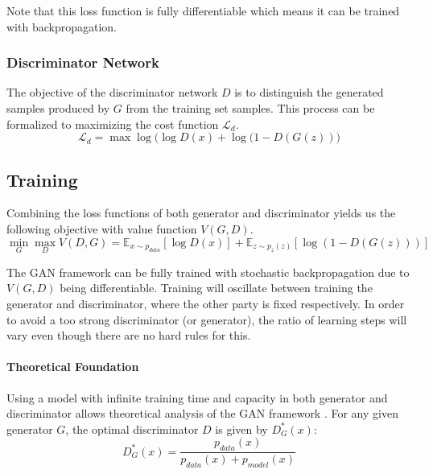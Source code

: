 Note that this loss function is fully differentiable which means it can be trained with backpropagation.



\subsubsection{Discriminator Network}
The objective of the discriminator network $D$ is to distinguish the generated samples produced by $G$ from the training set samples.
This process can be formalized to maximizing the cost function $\mathcal{L}_d$.
$$
\mathcal{L}_d = \max \log\big(\log D(x) + \log (1 - D(G(z))\big)
$$


\newpage

\subsection{Training}
\label{sub:gan_training}
Combining the loss functions of both generator and discriminator yields us the following objective with value function $V(G,D)$.
$$
\min_G \max_D V(D,G) = \mathbb{E}_{x \sim p_{data}}[\log D(x)] + \mathbb{E}_{z \sim p_z(z)}[\log(1 - D(G(z)))]
$$

The GAN framework can be fully trained with stochastic backpropagation due to $V(G,D)$ being differentiable.
Training will oscillate between training the generator and discriminator, where the other party is fixed respectively.
In order to avoid a too strong discriminator (or generator), the ratio of learning steps will vary even though there are no hard rules for this.

\vspace{5cm}
\paragraph{Theoretical Foundation}
Using a model with infinite training time and capacity in both generator and discriminator allows theoretical analysis of the GAN framework \cite{gan:2014}.
For any given generator $G$, the optimal discriminator $D$ is given by $D_G^*(x)$:
$$
D_G^*(x) = \frac{p_{data}(x)}{p_{data}(x) + p_{model}(x)}
$$

